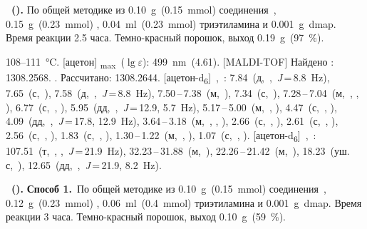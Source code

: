 \textbf{~().} 
По общей методике из \SI{0.10}{\gram}~(\SI{0.15}{\milli\mole}) соединения~, \SI{0.15}{\gram}~(\SI{0.23}{\milli\mole}) , \SI{0.04}{\milli\litre}~(\SI{0.23}{\milli\mole}) триэтиламина и \SI{0.001}{\gram}~\ac{dmap}.
Время реакции 2.5 часа.
Темно-красный порошок, выход \SI{0.19}{\gram}~(\SI{97}{\percent}).
\begin{experimental}
     108--\SI{111}{\celsius}.
    [ацетон] \chemlambda\textsubscript{max}~($\lg \varepsilon$): \SI{499}{\nano\metre}~(4.61).
    [MALDI-TOF] Найдено \ce{[M + H]+}: \num{1308.2568}. . Рассчитано: \ce{[M + H]} \num{1308.2644}.
    [ацетон-d\textsubscript{6}]~\chemdelta,~\si{\ppm}: 7.84~(д,~,~\textit{J}\,=\,8.8~\si{\hertz}), 7.65~(с,~), 7.58~(д,~,~\textit{J}\,=\,8.8~\si{\hertz}), 7.50\,--\,7.38~(м,~), 7.34~(с,~), 7.28\,--\,7.04~(м,~, , ), 6.77~(с,~, ), 5.95~(дд,~,~\textit{J}\,=\,12.9, 5.7~\si{\hertz}), 5.17\,--\,5.00~(м,~, ), 4.47~(с,~, ), 4.09~(дд,~,~\textit{J}\,=\,17.8, 12.9~\si{\hertz}), 3.64\,--\,3.18~(м,~, , ), 2.66~(с,~, ), 2.61~(с,~, ), 2.56~(с,~, ), 1.83~(с,~, ), 1.30\,--\,1.22~(м,~, ), 1.07~(с,~, ).
    [ацетон-d\textsubscript{6}]~\chemdelta,~\si{\ppm}: 107.51~(т,~, ,~\textit{J}\,=\,21.9~\si{\hertz}), 32.23\,--\,31.88~(м,~), 22.26\,--\,21.42~(м,~), 18.23~(уш. с,~), 12.65~(дд,~,~\textit{J}\,=\,21.9, 8.2~\si{\hertz}).
\end{experimental}


\textbf{~().} 
\textbf{Способ 1.}~По общей методике из \SI{0.10}{\gram}~(\SI{0.15}{\milli\mole}) соединения~, \SI{0.12}{\gram}~(\SI{0.23}{\milli\mole}) , \SI{0.06}{\milli\litre}~(\SI{0.4}{\milli\mole}) триэтиламина и \SI{0.001}{\gram}~\ac{dmap}.
Время реакции 3 часа.
Темно-красный порошок, выход \SI{0.10}{\gram}~(\SI{59}{\percent}).

